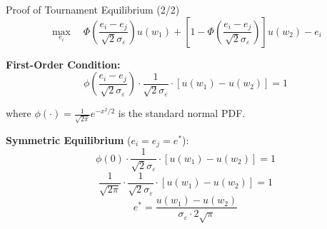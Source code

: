 \documentclass[xcolor={x11names}, aspectratio=169 ]{beamer}
\begin{document}
\begin{frame}{Proof of Tournament Equilibrium (2/2)}
$$\max_{e_i} \quad \Phi\left(\frac{e_i - e_j}{\sqrt{2}\sigma_\varepsilon}\right) u(w_1) + \left[1 - \Phi\left(\frac{e_i - e_j}{\sqrt{2}\sigma_\varepsilon}\right)\right] u(w_2) - e_i$$

\textbf{First-Order Condition:}
$$\phi\left(\frac{e_i - e_j}{\sqrt{2}\sigma_\varepsilon}\right) \cdot \frac{1}{\sqrt{2}\sigma_\varepsilon} \cdot [u(w_1) - u(w_2)] = 1$$

where $\phi(\cdot) = \frac{1}{\sqrt{2\pi}}e^{-x^2/2}$ is the standard normal PDF.

\textbf{Symmetric Equilibrium} ($e_i = e_j = e^*$):
$$\phi(0) \cdot \frac{1}{\sqrt{2}\sigma_\varepsilon} \cdot [u(w_1) - u(w_2)] = 1$$
$$\frac{1}{\sqrt{2\pi}} \cdot \frac{1}{\sqrt{2}\sigma_\varepsilon} \cdot [u(w_1) - u(w_2)] = 1$$
$$\boxed{e^* = \frac{u(w_1) - u(w_2)}{\sigma_\varepsilon \cdot 2\sqrt{\pi}}}$$
\end{frame}
\end{document}
